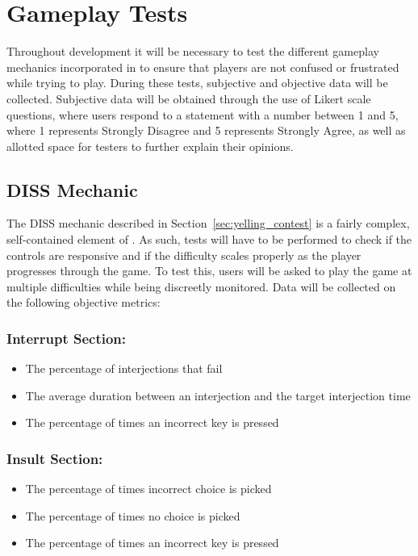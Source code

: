 \clearpage
\section{Gameplay Tests}

Throughout development it will be necessary to test the different gameplay mechanics incorporated in \ourgame{} to ensure that players are not confused or frustrated while trying to play. During these tests, subjective and objective data will be collected. Subjective data will be obtained through the use of Likert scale questions, where users respond to a statement with a number between 1 and 5, where 1 represents Strongly Disagree and 5 represents Strongly Agree, as well as allotted space for testers to further explain their opinions.

\subsection{DISS Mechanic}
The DISS mechanic described in Section~\ref{sec:yelling_contest} is a fairly complex, self-contained element of \ourgame{}. As such, tests will have to be performed to check if the controls are responsive and if the difficulty scales properly as the player progresses through the game. To test this, users will be asked to play the game at multiple difficulties while being discreetly monitored. Data will be collected on the following objective metrics:

\subsubsection{Interrupt Section:}
\begin{itemize}
\item{The percentage of interjections that fail}
\item{The average duration between an interjection and the target interjection time}
\item{The percentage of times an incorrect key is pressed}
\end{itemize}
\subsubsection{Insult Section:}
\begin{itemize}
\item{The percentage of times incorrect choice is picked}
\item{The percentage of times no choice is picked}
\item{The percentage of times an incorrect key is pressed}
\end{itemize}

